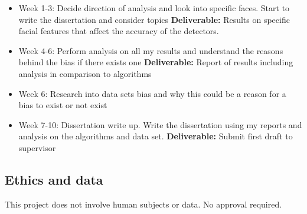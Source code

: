 \documentclass[11pt]{article}
\begin{document}
\begin{itemize}
    \item
      Week 1-3: Decide direction of analysis and look into specific faces. Start to write the dissertation and consider topics \textbf{Deliverable:}
      Results on specific facial features that affect the accuracy of the detectors.
    \item
      Week 4-6: Perform analysis on all my results and understand the reasons behind the bias if there exists one \textbf{Deliverable:} Report of results including analysis in comparison to algorithms
    \item 
      Week 6: Research into data sets bias and why this could be a reason for a bias to exist or not exist
    \item
      Week 7-10: Dissertation write up. Write the dissertation using my reports and analysis on the algorithms and data set. \textbf{Deliverable:} Submit first draft to supervisor
    \end{itemize}

    
\subsection{Ethics and data}\label{ethics}
This project does not involve human subjects or data. No approval required.
  
\end{document}
